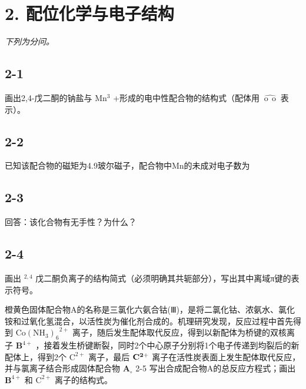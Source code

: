 \section*{2. 配位化学与电子结构}
\textit{下列为分问。}

\subsection*{2-1}
画出2,4-戊⼆酮的钠盐与 $\mathrm { M n ^ { 3 } }$ +形成的电中性配合物的结构式（配体⽤ $\widehat { \mathrm { ~ o ~ } \mathrm { ~ o ~ } }$ 表⽰）。

\subsection*{2-2}
已知该配合物的磁矩为4.9玻尔磁⼦，配合物中Mn的未成对电⼦数为

\subsection*{2-3}
回答：该化合物有⽆⼿性？为什么？

\subsection*{2-4}
画出 $^ { 2 , 4 }$ 戊⼆酮负离⼦的结构简式（必须明确其共轭部分），写出其中离域π键的表⽰符号。

橙⻩⾊固体配合物A的名称是三氯化六氨合钴(Ⅲ)，是将⼆氯化钴、浓氨⽔、氯化铵和过氧化氢混合，以活性炭为催化剂合成的。机理研究发现，反应过程中⾸先得到 $\mathrm { C o ( N H _ { 3 } ) _ { 6 } } ^ { 2 + }$ 离⼦，随后发⽣配体取代反应，得到以新配体为桥键的双核离⼦ $\mathbf { B } ^ { 4 + }$ ，接着发⽣桥键断裂，同时2个中⼼原⼦分别将1个电⼦传递到均裂后的新配体上，得到2个 $\mathrm { { C ^ { 2 + } } }$ 离⼦，最后 $\mathrm { \bf C ^ { 2 + } }$ 离⼦在活性炭表⾯上发⽣配体取代反应，并与氯离⼦结合形成固体配合物 $\mathbf { A } _ { \circ }$ 2-5 写出合成配合物A的总反应⽅程式；画出 $\mathbf { B } ^ { 4 + }$ 和 $\mathrm { { C ^ { 2 + } } }$ 离⼦的结构式。
